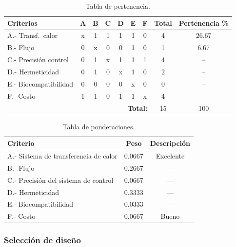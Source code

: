 \documentclass[11pt,tesis,twoside,openright,spanish]{upiiztt}
\begin{document}
\begin{table}[H]
\centering
\caption{Tabla de pertenencia.}
\label{tab:pertenencia}
\begin{tabular}{lcccccccc}
\toprule
\textbf{Criterios} & \textbf{A} & \textbf{B} & \textbf{C} & \textbf{D} & \textbf{E} & \textbf{F} & \textbf{Total} & \textbf{Pertenencia \%} \\
\midrule
A.- Transf.\ calor  & x & 1 & 1 & 1 & 1 & 0 & 4 & 26.67 \\
B.- Flujo            & 0 & x & 0 & 0 & 1 & 0 & 1 & 6.67 \\
C.- Precisión control & 0 & 1 & x & 1 & 1 & 1 & 4 & -- \\
D.- Hermeticidad     & 0 & 1 & 0 & x & 1 & 0 & 2 & -- \\
E.- Biocompatibilidad & 0 & 0 & 0 & 0 & x & 0 & 0 & -- \\
F.- Costo            & 1 & 1 & 0 & 1 & 1 & x & 4 & -- \\
\midrule
\multicolumn{7}{r}{\textbf{Total:}} & 15 & 100 \\
\bottomrule
\end{tabular}
\end{table}

\begin{table}[H]
\centering
\caption{Tabla de ponderaciones.}
\label{tab:ponderaciones}
\begin{tabular}{lcc}
\toprule
\textbf{Criterio} & \textbf{Peso} & \textbf{Descripción} \\
\midrule
A.- Sistema de transferencia de calor & 0.0667 & Excelente \\
B.- Flujo                              & 0.2667 & --- \\
C.- Precisión del sistema de control   & 0.0667 & --- \\
D.- Hermeticidad                       & 0.3333 & --- \\
E.- Biocompatibilidad                  & 0.0333 & --- \\
F.- Costo                              & 0.0667 & Bueno \\
\bottomrule
\end{tabular}
\end{table}

\subsubsection{Selección de diseño}
\end{document}
